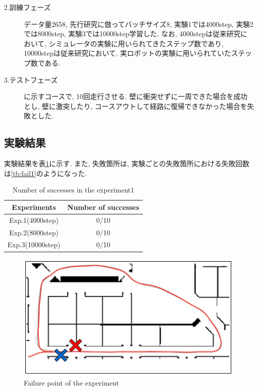 \newpage
\begin{description}
  \item[2.訓練フェーズ] データ量2658, 先行研究に倣ってバッチサイズ8, 実験1では4000step, 実験2では8000step, 実験3では10000step学習した. なお, 4000stepは従来研究において, シミュレータの実験に用いられてきたステップ数であり, 10000stepは従来研究において, 実ロボットの実験に用いられていたステップ数である. 
\end{description}

\begin{description}
  \item[3.テストフェーズ]に示すコースで, 10回走行させる. 壁に衝突せずに一周できた場合を成功とし, 壁に激突したり, コースアウトして経路に復帰できなかった場合を失敗とした.
\end{description}

\subsection{実験結果}
実験結果を表\ref{tb:exp1}に示す. また, 失敗箇所は, 実験ごとの失敗箇所における失敗回数は\ref{tb:fail1}のようになった. 

\begin{table}[h]
  \centering
  \begin{tabular}{|c|c|} \hline
    Experiments & Number of successes \\ \hline
    Exp.1(4000step) & 0/10 \\ \hline
    Exp.2(8000step) & 0/10 \\ \hline
    Exp.3(10000step) & 0/10 \\ \hline
  \end{tabular}
  \caption{Number of successes in the experiment1}
  \label{tb:exp1}
\end{table}

\begin{figure}[h]
  \centering
  \includegraphics[keepaspectratio, scale=0.5]{images/result1.png}
  \caption{Failure point of the experiment}
  \label{Fig:result1}
  \end{figure}

